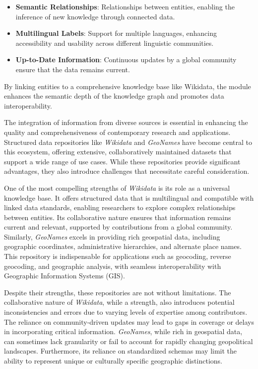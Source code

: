\begin{itemize}
    \item \textbf{Semantic Relationships}: Relationships between entities, enabling the inference of new knowledge through connected data.
    \item \textbf{Multilingual Labels}: Support for multiple languages, enhancing accessibility and usability across different linguistic communities.
    \item \textbf{Up-to-Date Information}: Continuous updates by a global community ensure that the data remains current.
\end{itemize}

By linking entities to a comprehensive knowledge base like Wikidata, the module enhances the semantic depth of the knowledge graph and promotes data interoperability.

The integration of information from diverse sources is essential in enhancing the quality and comprehensiveness of contemporary research and applications. Structured data repositories like \textit{Wikidata} \cite{vrandecicWikidataFreeCollaborative2014} and \textit{GeoNames} \cite{GeoNames} have become central to this ecosystem, offering extensive, collaboratively maintained datasets that support a wide range of use cases. While these repositories provide significant advantages, they also introduce challenges that necessitate careful consideration.

One of the most compelling strengths of \textit{Wikidata} is its role as a universal knowledge base. It offers structured data that is multilingual and compatible with linked data standards, enabling researchers to explore complex relationships between entities. Its collaborative nature ensures that information remains current and relevant, supported by contributions from a global community. Similarly, \textit{GeoNames} excels in providing rich geospatial data, including geographic coordinates, administrative hierarchies, and alternate place names. This repository is indispensable for applications such as geocoding, reverse geocoding, and geographic analysis, with seamless interoperability with Geographic Information Systems (GIS).

Despite their strengths, these repositories are not without limitations. The collaborative nature of \textit{Wikidata}, while a strength, also introduces potential inconsistencies and errors due to varying levels of expertise among contributors. The reliance on community-driven updates may lead to gaps in coverage or delays in incorporating critical information. \textit{GeoNames}, while rich in geospatial data, can sometimes lack granularity or fail to account for rapidly changing geopolitical landscapes. Furthermore, its reliance on standardized schemas may limit the ability to represent unique or culturally specific geographic distinctions.

